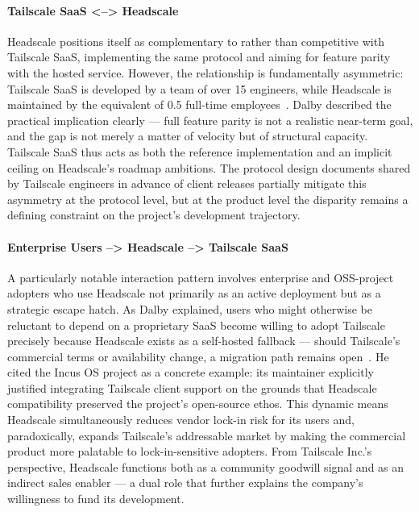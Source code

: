 \documentclass[11pt, a4paper]{article}
\begin{document}
\paragraph{Tailscale SaaS <--> Headscale}
Headscale positions itself as complementary to rather than competitive with Tailscale SaaS, implementing the same protocol and aiming for feature parity with the hosted service. However, the relationship is fundamentally asymmetric: Tailscale SaaS is developed by a team of over 15 engineers, while Headscale is maintained by the equivalent of 0.5 full-time employees~\cite{headscale_FOSDEM2026_speech}. Dalby described the practical implication clearly — full feature parity is not a realistic near-term goal, and the gap is not merely a matter of velocity but of structural capacity. Tailscale SaaS thus acts as both the reference implementation and an implicit ceiling on Headscale's roadmap ambitions. The protocol design documents shared by Tailscale engineers in advance of client releases partially mitigate this asymmetry at the protocol level, but at the product level the disparity remains a defining constraint on the project's development trajectory.

\paragraph{Enterprise Users --> Headscale --> Tailscale SaaS}
A particularly notable interaction pattern involves enterprise and OSS-project adopters who use Headscale not primarily as an active deployment but as a strategic escape hatch. As Dalby explained, users who might otherwise be reluctant to depend on a proprietary SaaS become willing to adopt Tailscale precisely because Headscale exists as a self-hosted fallback — should Tailscale's commercial terms or availability change, a migration path remains open~\cite{headscale_FOSDEM2026_speech}. He cited the Incus OS project as a concrete example: its maintainer explicitly justified integrating Tailscale client support on the grounds that Headscale compatibility preserved the project's open-source ethos. This dynamic means Headscale simultaneously reduces vendor lock-in risk for its users and, paradoxically, expands Tailscale's addressable market by making the commercial product more palatable to lock-in-sensitive adopters. From Tailscale Inc.'s perspective, Headscale functions both as a community goodwill signal and as an indirect sales enabler — a dual role that further explains the company's willingness to fund its development.
\end{document}
